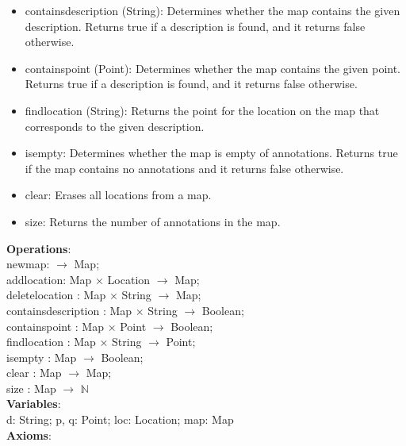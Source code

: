 \documentclass[12pt]{article}
\begin{document}
\begin{spacing}{1.5}
\begin{itemize}
	\item containsdescription (String): Determines whether the map contains the given
	description. Returns true if a description is found, and it returns false otherwise.
	\item containspoint (Point): Determines whether the map contains the given point.
	Returns true if a description is found, and it returns false otherwise.
	\item findlocation (String): Returns the point for the location on the map that corresponds to the given description.
	\item isempty: Determines whether the map is empty of annotations. Returns true if the
	map contains no annotations and it returns false otherwise.
	\item clear: Erases all locations from a map.
	\item size: Returns the number of annotations in the map.	
\end{itemize}
\noindent \textbf{Operations}:\\
\hspace*{5mm} newmap: $\rightarrow$ Map;\\
\hspace*{5mm} addlocation: Map $\times$ Location $\rightarrow$ Map;\\
\hspace*{5mm} deletelocation : Map $\times$ String $\rightarrow$ Map;\\
\hspace*{5mm} containsdescription : Map $\times$ String $\rightarrow$ Boolean;\\
\hspace*{5mm} containspoint : Map $\times$ Point  $\rightarrow$ Boolean;\\
\hspace*{5mm} findlocation : Map $\times$ String  $\rightarrow$ Point;\\
\hspace*{5mm} isempty : Map $\rightarrow$ Boolean;\\
\hspace*{5mm} clear : Map $\rightarrow$ Map;\\
\hspace*{5mm} size : Map $\rightarrow$ $\mathbb{N}$ \\
\noindent \textbf{Variables}:\\
\hspace*{5mm} d: String; p, q: Point; loc: Location; map: Map\\
\noindent \textbf{Axioms}:\\

\end{spacing}
\end{document}

